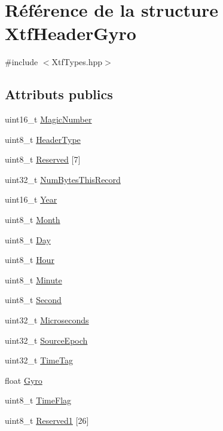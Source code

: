 \hypertarget{structXtfHeaderGyro}{}\section{Référence de la structure Xtf\+Header\+Gyro}
\label{structXtfHeaderGyro}


{\ttfamily \#include $<$Xtf\+Types.\+hpp$>$}

\subsection*{Attributs publics}
\begin{DoxyCompactItemize}
\item 
uint16\+\_\+t \hyperlink{structXtfHeaderGyro_a0c3ec12cdab19969fef3b141a98ec362}{Magic\+Number}
\item 
uint8\+\_\+t \hyperlink{structXtfHeaderGyro_ab28e7efcda9242b4bdb08557b16beb90}{Header\+Type}
\item 
uint8\+\_\+t \hyperlink{structXtfHeaderGyro_a85940ad89d69a78b55a3428577a3b21c}{Reserved} \mbox{[}7\mbox{]}
\item 
uint32\+\_\+t \hyperlink{structXtfHeaderGyro_a25420e37b193405adaed1b85ee7dc333}{Num\+Bytes\+This\+Record}
\item 
uint16\+\_\+t \hyperlink{structXtfHeaderGyro_aec617ad1ae79153ed3ad307d5aec9227}{Year}
\item 
uint8\+\_\+t \hyperlink{structXtfHeaderGyro_a7822067786a415fc90162384d72efff3}{Month}
\item 
uint8\+\_\+t \hyperlink{structXtfHeaderGyro_ad963020beeee806b7c5b8f82d9dd5715}{Day}
\item 
uint8\+\_\+t \hyperlink{structXtfHeaderGyro_a85f39f92d2f7ebb061b4cf601d8d9bfe}{Hour}
\item 
uint8\+\_\+t \hyperlink{structXtfHeaderGyro_a45f17b015a2311abbee3b6d22394c847}{Minute}
\item 
uint8\+\_\+t \hyperlink{structXtfHeaderGyro_ad741b6ad2d21952b9a5e202a2094790f}{Second}
\item 
uint32\+\_\+t \hyperlink{structXtfHeaderGyro_a1f17dc26ed56dd39571ab7659d728ac0}{Microseconds}
\item 
uint32\+\_\+t \hyperlink{structXtfHeaderGyro_a9ff2dd72393e49ab1fce01c1aae9e8c1}{Source\+Epoch}
\item 
uint32\+\_\+t \hyperlink{structXtfHeaderGyro_acca62eccaf3ac7899aac8414d8063b95}{Time\+Tag}
\item 
float \hyperlink{structXtfHeaderGyro_a069ec7f3085ca15e4e22e6d499c28244}{Gyro}
\item 
uint8\+\_\+t \hyperlink{structXtfHeaderGyro_af5a9a099f4f8950c1d77aeac02540dd7}{Time\+Flag}
\item 
uint8\+\_\+t \hyperlink{structXtfHeaderGyro_a567afc36a3461856d6563cd4249d68c0}{Reserved1} \mbox{[}26\mbox{]}
\end{DoxyCompactItemize}


